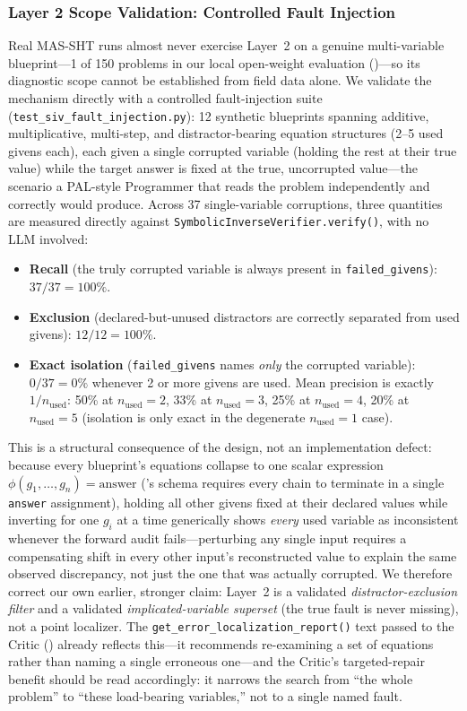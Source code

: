 \documentclass[11pt,a4paper]{article}
\begin{document}
\subsubsection{Layer 2 Scope Validation: Controlled Fault Injection}
\label{sec:siv_fault_injection}
Real MAS-SHT runs almost never exercise Layer~2 on a genuine multi-variable blueprint---1 of 150 problems in our local open-weight evaluation ()---so its diagnostic scope cannot be established from field data alone.
We validate the mechanism directly with a controlled fault-injection suite (\texttt{test\_siv\_fault\_injection.py}): 12 synthetic blueprints spanning additive, multiplicative, multi-step, and distractor-bearing equation structures (2--5 used givens each), each given a single corrupted variable (holding the rest at their true value) while the target answer is fixed at the true, uncorrupted value---the scenario a PAL-style Programmer that reads the problem independently and correctly would produce.
Across 37 single-variable corruptions, three quantities are measured directly against \texttt{SymbolicInverseVerifier.verify()}, with no LLM involved:
\begin{itemize}[leftmargin=*,itemsep=2pt]
    \item \textbf{Recall} (the truly corrupted variable is always present in \texttt{failed\_givens}): $37/37 = 100\%$.
    \item \textbf{Exclusion} (declared-but-unused distractors are correctly separated from used givens): $12/12 = 100\%$.
    \item \textbf{Exact isolation} (\texttt{failed\_givens} names \emph{only} the corrupted variable): $0/37 = 0\%$ whenever 2 or more givens are used. Mean precision is exactly $1/n_{\text{used}}$: 50\% at $n_{\text{used}}=2$, 33\% at $n_{\text{used}}=3$, 25\% at $n_{\text{used}}=4$, 20\% at $n_{\text{used}}=5$ (isolation is only exact in the degenerate $n_{\text{used}}=1$ case).
\end{itemize}
This is a structural consequence of the design, not an implementation defect: because every blueprint's equations collapse to one scalar expression $\phi(g_1,\ldots,g_n) = \text{answer}$ ('s schema requires every chain to terminate in a single \texttt{answer} assignment), holding all other givens fixed at their declared values while inverting for one $g_i$ at a time generically shows \emph{every} used variable as inconsistent whenever the forward audit fails---perturbing any single input requires a compensating shift in every other input's reconstructed value to explain the same observed discrepancy, not just the one that was actually corrupted.
We therefore correct our own earlier, stronger claim: Layer~2 is a validated \emph{distractor-exclusion filter} and a validated \emph{implicated-variable superset} (the true fault is never missing), not a point localizer.
The \texttt{get\_error\_localization\_report()} text passed to the Critic () already reflects this---it recommends re-examining a set of equations rather than naming a single erroneous one---and the Critic's targeted-repair benefit should be read accordingly: it narrows the search from ``the whole problem'' to ``these load-bearing variables,'' not to a single named fault.
\end{document}
